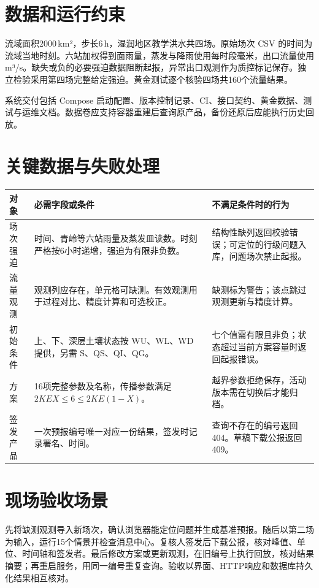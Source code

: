 \section{数据和运行约束}
流域面积2000\,km²，步长6\,h，湿润地区教学洪水共四场。原始场次 CSV 的时间为流域当地时刻。六站加权得到面雨量，蒸发与降雨使用每时段毫米，出口流量使用 m³/s。缺失或负的必要强迫数据阻断起报，异常出口观测作为质控标记保存。独立检验采用第四场完整给定强迫。黄金测试逐个核验四场共160个流量结果。
\par 系统交付包括 Compose 启动配置、版本控制记录、CI、接口契约、黄金数据、测试与运维文档。数据卷应支持容器重建后查询原产品，备份还原后应能执行历史回放。
\section{关键数据与失败处理}
\noindent\begin{tabularx}{\linewidth}{@{}p{2.4cm}LL@{}}\toprule 对象 & 必需字段或条件 & 不满足条件时的行为\\\midrule
场次强迫 & 时间、青岭等六站雨量及蒸发皿读数。时刻严格按6小时递增，强迫为有限非负数。 & 结构性缺列返回校验错误；可定位的行级问题入库，问题场次禁止起报。\\
流量观测 & 观测列应存在，单元格可缺测。有效观测用于过程对比、精度计算和可选校正。 & 缺测标为警告；该点跳过观测更新与精度计算。\\
初始条件 & 上、下、深层土壤状态按 WU、WL、WD 提供，另需 S、QS、QI、QG。 & 七个值需有限且非负；状态超过当前方案容量时返回起报错误。\\
方案 & 16项完整参数及名称，传播参数满足 $2KE X\le6\le2KE(1-X)$。 & 越界参数拒绝保存，活动版本需在切换后才能归档。\\
签发产品 & 一次预报编号唯一对应一份结果，签发时记录署名、时间。 & 查询不存在的编号返回404。草稿下载公报返回409。\\\bottomrule\end{tabularx}
\section{现场验收场景}
先将缺测观测导入新场次，确认浏览器能定位问题并生成基准预报。随后以第二场为输入，运行15个情景并检查消息中心。复核人签发后下载公报，核对峰值、单位、时间轴和签发者。最后修改方案或更新观测，在旧编号上执行回放，核对结果摘要；再重启服务，用同一编号重复查询。验收以界面、HTTP响应和数据库持久化结果相互核对。


